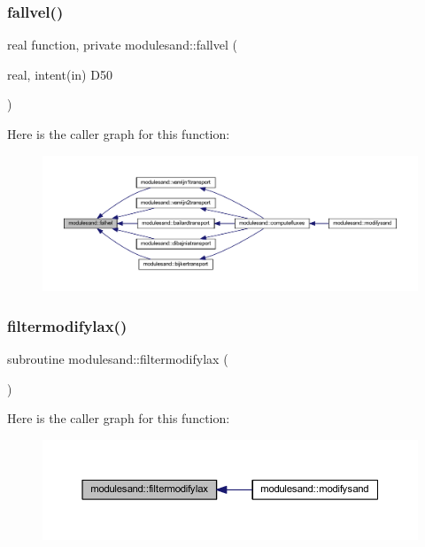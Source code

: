 \subsubsection{\texorpdfstring{fallvel()}{fallvel()}}
{\footnotesize\ttfamily real function, private modulesand\+::fallvel (\begin{DoxyParamCaption}\item[{real, intent(in)}]{D50 }\end{DoxyParamCaption})\hspace{0.3cm}{\ttfamily [private]}}

Here is the caller graph for this function\+:\nopagebreak
\begin{figure}[H]
\begin{center}
\leavevmode
\includegraphics[width=350pt]{namespacemodulesand_a81b51403d378065ebb345027ab24a5af_icgraph}
\end{center}
\end{figure}
\mbox{\label{namespacemodulesand_a580330ec253695e422a7fa01ca03e69f}} 
\subsubsection{\texorpdfstring{filtermodifylax()}{filtermodifylax()}}
{\footnotesize\ttfamily subroutine modulesand\+::filtermodifylax (\begin{DoxyParamCaption}{ }\end{DoxyParamCaption})\hspace{0.3cm}{\ttfamily [private]}}

Here is the caller graph for this function\+:\nopagebreak
\begin{figure}[H]
\begin{center}
\leavevmode
\includegraphics[width=350pt]{namespacemodulesand_a580330ec253695e422a7fa01ca03e69f_icgraph}
\end{center}
\end{figure}
\mbox{\label{namespacemodulesand_a4e0db1b5661a069c0d842ef833c61439}} 
